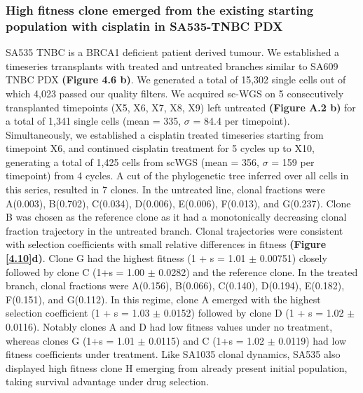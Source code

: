 \subsubsection{High fitness clone emerged from the existing starting population with cisplatin in SA535-TNBC PDX}
 SA535 TNBC is a BRCA1 deficient patient derived tumour. We established a timeseries trransplants with treated and untreated branches similar to SA609 TNBC PDX \textbf{(Figure 4.6 b)}. 
 We generated a total of 15,302 single cells out of which 4,023 passed our quality filters.
 We acquired sc-WGS on 5 consecutively transplanted timepoints (X5, X6, X7, X8, X9) left untreated \textbf{(Figure A.2 b)} for a total of 1,341 single cells (mean = 335, $\sigma$ = 84.4 per timepoint). Simultaneously, we established a cisplatin treated timeseries starting from timepoint X6, and continued cisplatin treatment for 5 cycles up to X10, generating a total of 1,425 cells from scWGS (mean = 356, $\sigma$ = 159 per timepoint) from 4 cycles. A cut of the phylogenetic tree inferred over all cells in this series, resulted in 7 clones. In the untreated line, clonal fractions were A(0.003), B(0.702), C(0.034), D(0.006), E(0.006), F(0.013), and G(0.237).
Clone B was chosen as the reference clone as it had a monotonically decreasing clonal fraction trajectory in the untreated branch. Clonal trajectories were consistent with selection coefficients
with small relative differences in fitness \textbf{(Figure \ref{4.10}d)}. Clone G had the highest fitness (1 + s = 1.01 $\pm$ 0.00751) closely followed by clone C (1+s = 1.00 $\pm$ 0.0282) and the reference clone. In the treated branch, clonal fractions were A(0.156), B(0.066), C(0.140), D(0.194), E(0.182), F(0.151), and G(0.112). In this regime, clone A emerged with the highest selection coefficient (1 + s = 1.03
$\pm$  0.0152) followed by clone D (1 + s = 1.02 $\pm$ 0.0116). Notably clones A and D had low fitness values under no treatment, whereas clones G (1+s = 1.01 $\pm$ 0.0115) and C (1+s = 1.02 $\pm$ 0.0119) had low fitness coefficients under treatment. Like SA1035 clonal dynamics, SA535 also displayed high fitness clone H emerging from already present initial population,  taking survival advantage under drug selection.



